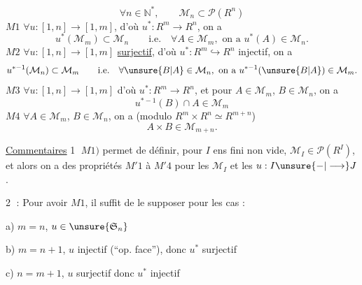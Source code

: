 \[
\forall n\in\mathbb N^*,\qquad\mathcal M_n\subset\mathcal P(R^n)
\]
\textcircled{\scriptsize$M1$} $\forall u:[1,n]\longrightarrow[1,m]$, d'où $u^*:R^m\longrightarrow R^n$, on a
\[
u^*(\mathcal M_m)\subset\mathcal M_n\qquad\text{i.e.}\quad\forall A\in\mathcal M_m,\text{ on a }u^*(A)\in\mathcal M_n.
\]
\textcircled{\scriptsize$M2$} $\forall u:[1,n]\longrightarrow[1,m]$ \uline{surjectif}, d'où $u^*:R^m\hookrightarrow R^n$ injectif, on a
\[
u^{*-1}(\mathcal M_n)\subset\mathcal M_m\qquad\text{i.e.}\quad\forall \unsure{B|A}\in\mathcal M_n,\text{ on a }u^{*-1}(\unsure{B|A})\in\mathcal M_m.
\]
\textcircled{\scriptsize$M3$} $\forall u:[1,n]\longrightarrow[1,m]$ d'où $u^*:R^m\longrightarrow R^n$, et pour $A\in\mathcal M_m$, $B\in\mathcal M_n$, on a
\[
u^{*-1}(B)\cap A\in\mathcal M_m
\]
\textcircled{\scriptsize$M4$} $\forall A\in\mathcal M_m$, $B\in\mathcal M_n$, on a (modulo $R^m\times R^n\simeq R^{m+n}$)
\[
A\times B\in\mathcal M_{m+n}.
\]

\uline{Commentaires} \textcircled{1} $M1)$ permet de définir, pour  $I$ ens fini non vide, $\mathcal M_I\in\mathcal P(R^I)$, et alors on a des propriétés $M'1$ à $M'4$ pour les $\mathcal M_I$ et les $u:I\unsure{-|\longrightarrow}J$.

\textcircled{2} : Pour avoir $M1$, il suffit de le supposer pour les  cas :

a) $m=n$, $u\in\unsure{\mathfrak S_n}$

b) $m=n+1$, $u$ injectif (``op. face''), donc $u^*$ surjectif

c) $n=m+1$, $u$ surjectif   donc $u^*$ injectif



